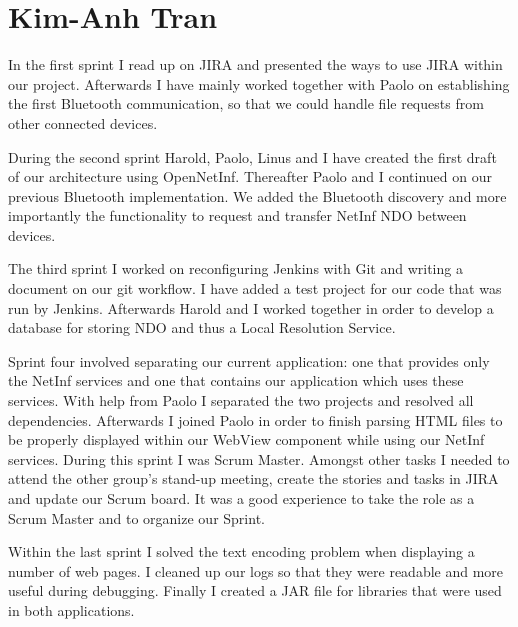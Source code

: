 \section{Kim-Anh Tran}
In the first sprint I read up on JIRA and presented the ways to use
JIRA within our project. Afterwards I have mainly worked together with Paolo on establishing
the first Bluetooth communication, so that we could handle file requests from other connected
devices. %

During the second sprint Harold, Paolo, Linus and I have created the first draft of our architecture using OpenNetInf. Thereafter Paolo and I continued on our previous Bluetooth implementation. We added
the Bluetooth discovery and more importantly the functionality to request and
transfer NetInf NDO between devices.

The third sprint I worked on reconfiguring Jenkins with Git and writing a document on
our git workflow. I have added a test project for our code that was run by Jenkins.
Afterwards Harold and I worked together in order to develop a database for storing
NDO and thus a Local Resolution Service.

Sprint four involved separating our current application: one that provides
only the NetInf services and one that contains our application which uses
these services. With help from Paolo I separated the two projects and resolved
all dependencies. Afterwards I joined Paolo in order to finish parsing HTML files
to be properly displayed within our WebView component while using our NetInf services.
During this sprint I was Scrum Master. Amongst other tasks I needed to attend the other group's
stand-up meeting, create the stories and tasks in JIRA and update our Scrum board.
It was a good experience to take the role as a Scrum Master and to organize our Sprint.

Within the last sprint I solved the text encoding problem when displaying 
a number of web pages. I cleaned up our logs so that they were readable and
more useful during debugging. Finally I created a JAR file for
libraries that were used in both applications.

